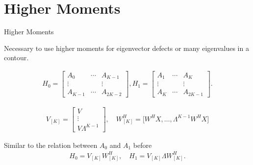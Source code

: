 \documentclass[mathserif, xcolor=table]{beamer}
\begin{document}
\section{Higher Moments}
\begin{frame}{Higher Moments}
	
	Necessary to use higher moments for eigenvector defects or many eigenvalues in a contour.

	\begin{align}
		H_0 = 
		\begin{bmatrix}
			{A}_0      & \cdots & {A}_{K-1}  \\
			\vdots             &        & \vdots \\
			{A}_{K-1}  & \cdots & {A}_{2K-2} 
		\end{bmatrix},
		H_1 = 
		\begin{bmatrix}
			{A}_1      & \cdots & {A}_{K}  \\
			\vdots             &        & \vdots \\
			{A}_{K}    & \cdots & {A}_{2K-1} 
		\end{bmatrix}.
	\end{align}

	\begin{align}
		V_{[K]} = 
		\begin{bmatrix}
			V \\
			\vdots \\
			V \Lambda^{K-1}
		\end{bmatrix},
		\quad
		W^H_{[K]} = \big[W^HX, \ldots, \Lambda^{K-1} W^H X \big]
	\end{align}
	
	Similar to the relation between \( A_0  \) and \( A_1 \) before
	\begin{align}
		H_0 = V_{[K]}W^H_{[K]}, \quad
		H_1 = V_{[K]} \Lambda W^H_{[K]}.
	\end{align}


\end{frame}
\end{document}
